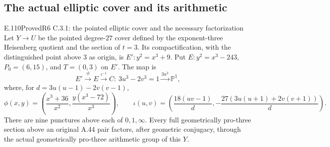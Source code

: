 \subsection{The actual elliptic cover and its arithmetic}

\begin{result}{E.110}{Proved}{R6 C.3.1: the pointed elliptic cover and the necessary factorization}
Let $Y\to U$ be the pointed degree-$27$ cover defined by the
exponent-three Heisenberg quotient and the section of $t=3$. Its
compactification, with the distinguished point above $3$ as origin, is
$E':y^2=x^3+9$. Put $E:y^2=x^3-243$, $P_0=(6,15)$, and $T=(0,3)$ on $E'$.
The map is
\[
 E'\xrightarrow{\phi}E\xrightarrow{\iota^{-1}}
 C:\ 3u^3-2v^3=1\xrightarrow{3u^3}\mathbb P^1,
\]
where, for $d=3u(u-1)-2v(v-1)$,
\[
 \phi(x,y)=\left(\frac{x^3+36}{x^2},
                    \frac{y(x^3-72)}{x^3}\right),\qquad
 \iota(u,v)=\left(\frac{18(uv-1)}d,
       -\frac{27(3u(u+1)+2v(v+1))}d\right).
\]
There are nine punctures above each of $0,1,\infty$. Every full
geometrically pro-three section above an original A.44 pair factors,
after geometric conjugacy, through the actual geometrically pro-three
arithmetic group of this $Y$.
\end{result}

